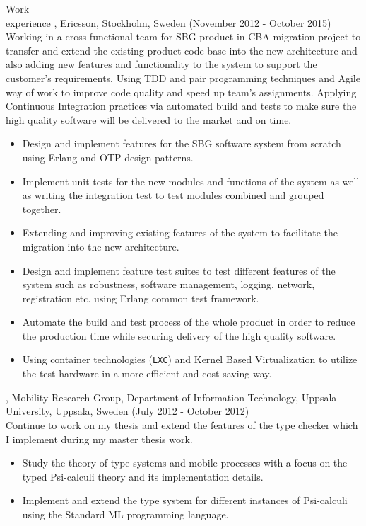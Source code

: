\documentclass{resume}
\begin{document}
\begin{category}{Work \\experience}
, Ericsson, Stockholm, Sweden (November 2012 - October 2015)\\
Working in a cross functional team for SBG product in CBA migration project to 
transfer and extend the existing product code base into the new architecture and also 
adding new features and functionality to the system to support the customer's requirements.
Using TDD and pair programming techniques and Agile way of work to improve code quality and
speed up team's assignments. Applying Continuous Integration practices via automated build and tests to 
make sure the high quality software will be delivered to the market and on time.
\begin{itemize}
 \item Design and implement features for the SBG software system from scratch using 
       Erlang and OTP design patterns.
 \item Implement unit tests for the new modules and functions of the system as well as 
       writing the integration test to test modules combined and grouped together. 
 \item Extending and improving existing features of the system to facilitate the 
       migration into the new architecture.
 \item Design and implement feature test suites to test different features of the 
       system such as robustness, software management, logging, network, registration 
       etc. using Erlang common test framework.
 \item Automate the build and test process of the whole product in order to reduce the production time
       while securing delivery of the high quality software.
 \item Using container technologies (\texttt{LXC}) and Kernel Based Virtualization to utilize the 
       test hardware in a more efficient and cost saving way.
\end{itemize}

, Mobility Research Group, Department of Information Technology, 
Uppsala University, Uppsala, Sweden (July 2012 - October 2012)\\
Continue to work on my thesis and extend the features of the type checker which I 
implement during my master thesis work.
\begin{itemize}
 \item Study the theory of type systems and mobile processes with a 
       focus on the typed Psi-calculi theory and its implementation details.
 \item Implement and extend the type system for different instances of Psi-calculi 
       using the Standard ML programming language.
\end{itemize}


\end{category}
\end{document}

